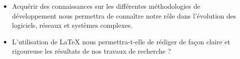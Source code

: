 \begin{itemize}[nosep]
    \item Acquérir des connaissances sur les différentes méthodologies de développement nous permettra de connaître notre rôle dans l’évolution des logiciels, réseaux et systèmes complexes.
    \item L’utilisation de \LaTeX{} nous permettra-t-elle de rédiger de façon claire et rigoureuse les résultats de nos travaux de recherche ?
\end{itemize}
